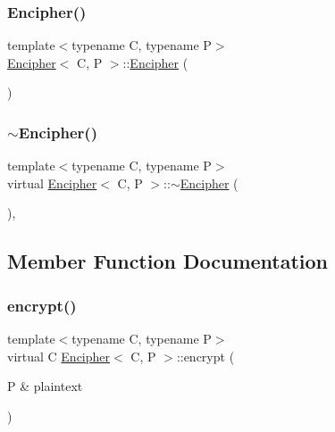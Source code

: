 \subsubsection{\texorpdfstring{Encipher()}{Encipher()}}
{\footnotesize\ttfamily template$<$typename C, typename P$>$ \\
\hyperlink{classEncipher}{Encipher}$<$ C, P $>$\+::\hyperlink{classEncipher}{Encipher} (\begin{DoxyParamCaption}{ }\end{DoxyParamCaption})\hspace{0.3cm}{\ttfamily [inline]}}

\mbox{\label{classEncipher_a0960dbd85f3b203438e16d2027e557fa}} 
\subsubsection{\texorpdfstring{$\sim$\+Encipher()}{~Encipher()}}
{\footnotesize\ttfamily template$<$typename C, typename P$>$ \\
virtual \hyperlink{classEncipher}{Encipher}$<$ C, P $>$\+::$\sim$\hyperlink{classEncipher}{Encipher} (\begin{DoxyParamCaption}{ }\end{DoxyParamCaption})\hspace{0.3cm}{\ttfamily [inline]}, {\ttfamily [virtual]}}



\subsection{Member Function Documentation}
\mbox{\label{classEncipher_aaf8138eb280608bfd03c6eb762ffc010}} 
\subsubsection{\texorpdfstring{encrypt()}{encrypt()}}
{\footnotesize\ttfamily template$<$typename C, typename P$>$ \\
virtual C \hyperlink{classEncipher}{Encipher}$<$ C, P $>$\+::encrypt (\begin{DoxyParamCaption}\item[{P \&}]{plaintext }\end{DoxyParamCaption})\hspace{0.3cm}{\ttfamily [pure virtual]}}



